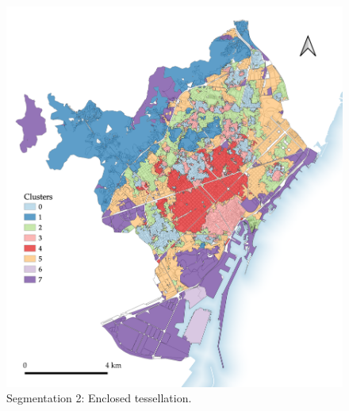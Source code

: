 \documentclass[a4paper, nobind]{templates/ociamthesis}
\begin{document}
\begin{figure}

{\centering \includegraphics[width=.8\paperwidth]{figures/maps/ET_8cls_5sw 2} 

}

\caption[Segmentation 2: Enclosed tessellation.]{Segmentation 2: Enclosed tessellation.}\label{fig:ET-map-BCN}
\end{figure}
\end{document}
